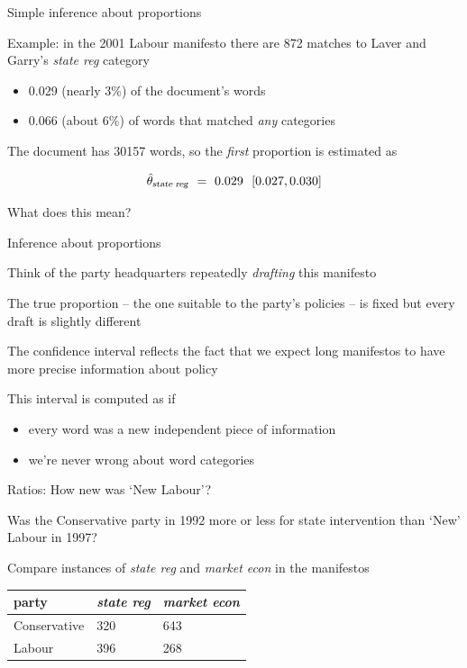 \documentclass{hertieteaching}
\begin{document}
\begin{frame}{Simple inference about proportions}
\protect\hypertarget{simple-inference-about-proportions}{}

Example: in the 2001 Labour manifesto there are 872 matches to Laver and
Garry's \emph{state reg} category

\begin{itemize}
\item
  0.029 (nearly 3\%) of the document's words\item
  0.066 (about 6\%) of words that matched \emph{any} categories
\end{itemize}

The document has 30157 words, so the \emph{first} proportion is
estimated as

\[
\hat{\theta}_\text{\textsl{state reg}} ~=~ 0.029 ~~[0.027, 0.030]
\]

What does this mean?

\end{frame}

\begin{frame}{Inference about proportions}
\protect\hypertarget{inference-about-proportions}{}

Think of the party headquarters repeatedly \emph{drafting} this
manifesto

The true proportion -- the one suitable to the party's policies -- is
fixed but every draft is slightly different

The confidence interval reflects the fact that we expect long manifestos
to have more precise information about policy

\pause

This interval is computed as if

\begin{itemize}
\item
  every word was a new independent piece of information\item
  we're never wrong about word categories
\end{itemize}

\end{frame}

\begin{frame}{Ratios: How new was `New Labour'?}
\protect\hypertarget{ratios-how-new-was-new-labour}{}

Was the Conservative party in 1992 more or less for state intervention
than `New' Labour in 1997?

Compare instances of \emph{state reg} and \emph{market econ} in the
manifestos

\begin{longtable}[]{@{}lll@{}}
\toprule
party & \emph{state reg} & \emph{market econ}\tabularnewline
\midrule
\endhead
Conservative & 320 & 643\tabularnewline
Labour & 396 & 268\tabularnewline
\bottomrule
\end{longtable}

\end{frame}
\end{document}
